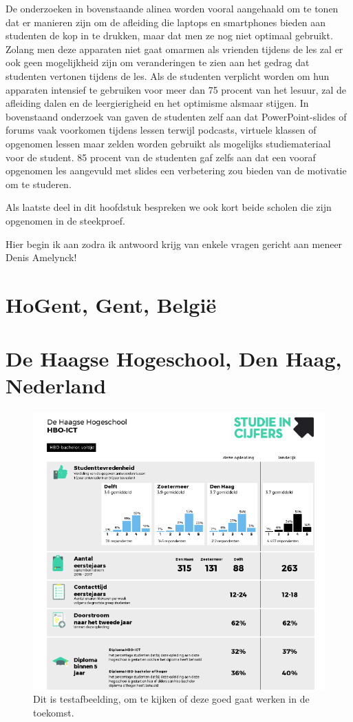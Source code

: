 De onderzoeken in bovenstaande alinea worden vooral aangehaald om te tonen dat er manieren zijn om de afleiding die laptops en smartphones bieden aan studenten de kop in te drukken, maar dat men ze nog niet optimaal gebruikt. Zolang men deze apparaten niet gaat omarmen als vrienden tijdens de les zal er ook geen mogelijkheid zijn om veranderingen te zien aan het gedrag dat studenten vertonen tijdens de les. Als de studenten verplicht worden om hun apparaten intensief te gebruiken voor meer dan 75 procent van het lesuur, zal de afleiding dalen en de leergierigheid en het optimisme alsmaar stijgen. In bovenstaand onderzoek van \textcite{Farley2015} gaven de studenten zelf aan dat PowerPoint-slides of forums vaak voorkomen tijdens lessen terwijl podcasts, virtuele klassen of opgenomen lessen maar zelden worden gebruikt als mogelijks studiemateriaal voor de student. 85 procent van de studenten gaf zelfs aan dat een vooraf opgenomen les aangevuld met slides een verbetering zou bieden van de motivatie om te studeren.

Als laatste deel in dit hoofdstuk bespreken we ook kort beide scholen die zijn opgenomen in de steekproef.

Hier begin ik aan zodra ik antwoord krijg van enkele vragen gericht aan meneer Denis Amelynck!

\section{HoGent, Gent, België}
\label{sec:hogent}

\section{De Haagse Hogeschool, Den Haag, Nederland}
\label{sec:haagsehogeschool}

\begin{figure}
	\includegraphics[width=\textwidth]
	{img/hbo-ict.png}
	\caption{Dit is testafbeelding, om te kijken of deze goed gaat werken in de toekomst.}
	\label{fig:hboict}
\end{figure}

